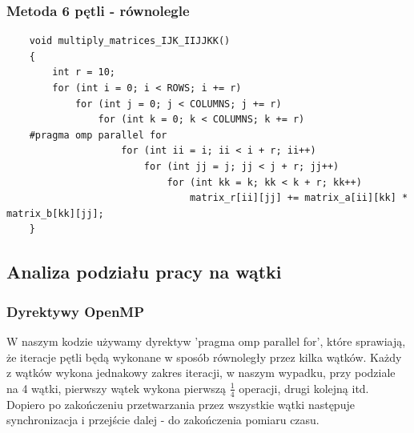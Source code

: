 \documentclass[10pt,a4paper]{article}
\begin{document}
\subsubsection{Metoda 6 pętli - równolegle}
\begin{lstlisting}
    void multiply_matrices_IJK_IIJJKK()
    {
        int r = 10;
        for (int i = 0; i < ROWS; i += r)
            for (int j = 0; j < COLUMNS; j += r)
                for (int k = 0; k < COLUMNS; k += r)
    #pragma omp parallel for
                    for (int ii = i; ii < i + r; ii++)
                        for (int jj = j; jj < j + r; jj++)
                            for (int kk = k; kk < k + r; kk++)
                                matrix_r[ii][jj] += matrix_a[ii][kk] * matrix_b[kk][jj];
    }
\end{lstlisting}
\newpage

\subsection{Analiza podziału pracy na wątki}
\subsubsection{Dyrektywy OpenMP}
W naszym kodzie używamy dyrektyw 'pragma omp parallel for', które sprawiają, że iteracje pętli
będą wykonane w sposób równoległy przez kilka wątków. Każdy z wątków wykona jednakowy zakres
iteracji, w naszym wypadku, przy podziale na 4 wątki, pierwszy wątek wykona pierwszą $\frac{1}{4}$
operacji, drugi kolejną itd. Dopiero po zakończeniu przetwarzania przez wszystkie wątki następuje
synchronizacja i przejście dalej - do zakończenia pomiaru czasu.
\end{document}
